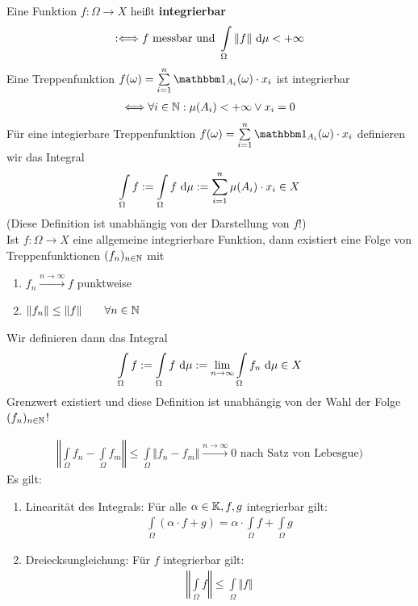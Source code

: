 Eine Funktion $f:\Omega\to X$ heißt \textbf{integrierbar}
\begin{align*}
:\Longleftrightarrow f\text{ messbar und }\int\limits_\Omega\Vert f\Vert\text{ d}\mu<+\infty
\end{align*}
Eine Treppenfunktion $f(\omega)=\sum\limits_{i=1}^n\indi_{A_i}(\omega)\cdot x_i$ ist integrierbar
\begin{align*}
\Longleftrightarrow\forall i\in\mathbb{N}: \mu(A_i)<+\infty\vee x_i=0
\end{align*}
Für eine integierbare Treppenfunktion $f(\omega)=\sum\limits_{i=1}^n\indi_{A_i}(\omega)\cdot x_i$ definieren wir das Integral
\begin{align*}
\int\limits_\Omega f:=\int\limits_\Omega f\text{ d}\mu:=\sum\limits_{i=1}^n\mu(A_i)\cdot x_i\in X
\end{align*}
(Diese Definition ist unabhängig von der Darstellung von $f$!)\\
Ist $f:\Omega\to X$ eine allgemeine integrierbare Funktion, dann existiert eine Folge von Treppenfunktionen $(f_n)_{n\in\mathbb{N}}$ mit
\begin{enumerate}
\item $f_n\stackrel{n\to\infty}{\longrightarrow} f$ punktweise
\item $\begin{aligned}
\Vert f_n\Vert\leq\Vert f\Vert\qquad\forall n\in\mathbb{N}
\end{aligned}$
\end{enumerate}
Wir definieren dann das Integral 
\begin{align*}
\int\limits_\Omega f:=\int\limits_\Omega f\text{ d}\mu:=\lim\limits_{n\to\infty} \int\limits_\Omega f_n\text{ d}\mu\in X
\end{align*}
Grenzwert existiert und diese Definition ist unabhängig von der Wahl der Folge $(f_n)_{n\in\mathbb{N}}$!

\begin{align*}
\left\Vert\int\limits_\Omega f_n-\int\limits_\Omega f_m\right\Vert\leq\int\limits_\Omega\big\Vert f_n-f_m\big\Vert\stackrel{n\to\infty}{\longrightarrow}0\text{ nach Satz von Lebesgue)}
\end{align*}
Es gilt:
\begin{enumerate}[label=(\arabic*)]
\item Linearität des Integrals: Für alle $\alpha\in\mathbb{K},f,g$ integrierbar gilt:
\begin{align*}
\int\limits_\Omega(\alpha\cdot f+g)=\alpha\cdot\int\limits_\Omega f+\int\limits_\Omega g
\end{align*}
\item Dreiecksungleichung: Für $f$ integrierbar gilt:
\begin{align*}
\left\Vert\int\limits_\Omega f\right\Vert\leq\int\limits_\Omega\Vert f\Vert
\end{align*}
\end{enumerate}

